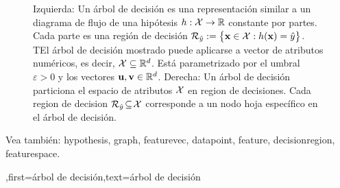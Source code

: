 {{\begin{figure}[H]
\begin{minipage}{.45\textwidth}
\end{minipage}
	\caption{Izquierda: Un árbol de decisión es una representación similar a un diagrama de flujo de una hipótesis $h: \mathcal{X} \rightarrow \mathbb{R}$ constante por partes.  Cada parte es una región de decisión $\mathcal{R}_{\hat{y}} := \big\{ {\bf x} \in  \mathcal{X}: h({\bf x}) = \hat{y} \big\}$. 
		TEl árbol de decisión mostrado puede aplicarse a vector de atributos numéricos, es decir, $\mathcal{X} \subseteq \mathbb{R}^{d}$. Está parametrizado por el umbral $\varepsilon>0$ y los vectores ${\bf u}, {\bf v} \in \mathbb{R}^{d}$. 
		Derecha: Un árbol de decisión particiona
		el espacio de atributos $\mathcal{X}$ en region de decisiones. Cada region de decision 
		$\mathcal{R}_{\hat{y}} \!\subseteq\!\mathcal{X}$ corresponde a un nodo hoja específico en el árbol de decisión.}
	\label{fig_decision_tree}
\end{figure} 
Vea también: \gls{hypothesis}, \gls{graph}, \gls{featurevec}, \gls{datapoint}, \gls{feature}, \gls{decisionregion}, \gls{featurespace}.},first={árbol de decisión},text={árbol de decisión} }



